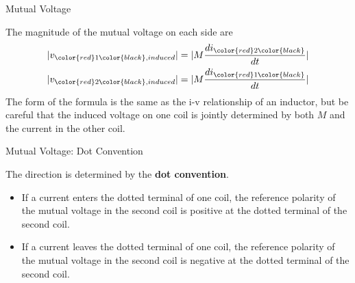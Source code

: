 \documentclass{beamer}
\begin{document}

\begin{frame}{Mutual Voltage}

The magnitude of the mutual voltage on each side are
$$
    \begin{aligned}
        \vert v_{\color{red}1\color{black},induced} \vert &= \vert M\frac{di_{\color{red}2\color{black}}}{dt}\vert\\
        \vert v_{\color{red}2\color{black},induced} \vert &= \vert M\frac{di_{\color{red}1\color{black}}}{dt} \vert
    \end{aligned}
$$
The form of the formula is the same as the i-v relationship of an inductor, but be careful that the induced voltage on one coil is jointly determined by both $M$ and \color{red} the current in the other coil\color{black}.

\end{frame}

\begin{frame}{Mutual Voltage: Dot Convention}

The direction is determined by the \textbf{dot convention}.

\vspace{0.3cm}

\begin{itemize}
    \item If a current \color{red}enters \color{black} the dotted terminal of one coil, the reference polarity of the mutual voltage in the second coil is positive at the dotted terminal of the second coil.
    \item If a current leaves the dotted terminal of one coil, the reference polarity of the mutual voltage in the second coil is negative at the dotted terminal of the second coil.
\end{itemize}


\end{frame}
\end{document}

